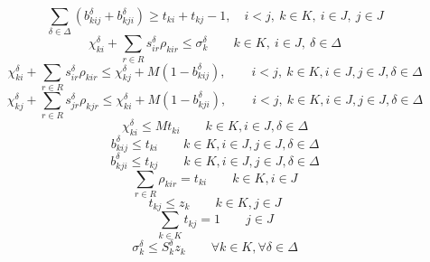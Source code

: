 \documentclass{scrartcl}
\begin{document}
\begin{equation}
\sum_{\delta\in\Delta}(b_{kij}^\delta + b_{kji}^\delta) \geq t_{ki} + t_{kj} - 1, \quad i < j,\ k \in K,\ i \in J,\ j \in J
\end{equation}
\begin{equation}
\label{eq:rho:kir:leq:sigmakdelta}
\chi_{ki}^\delta + \sum_{r \in R} s_{ir}^\delta \rho_{kir} \leq \sigma_k^\delta \quad \quad k \in K,\ i \in J,\ \delta \in \Delta
\end{equation}
\begin{equation}
\label{eq:rho:kir:leq:precedenceA}
\chi_{ki}^\delta + \sum_{r \in R} s_{ir}^\delta \rho_{kir} \leq \chi_{kj}^\delta + M(1 - b_{kij}^\delta), \quad \quad i < j,\ k \in K, i \in J, j \in J, \delta \in \Delta
\end{equation}
\begin{equation}
\label{eq:rho:kir:leq:precedenceB}
\chi_{kj}^\delta + \sum_{r \in R} s_{jr}^\delta \rho_{kjr} \leq \chi_{ki}^\delta + M(1 - b_{kji}^\delta), \quad \quad i < j,\ k \in K, i \in J, j \in J, \delta \in \Delta
\end{equation}
\begin{equation}
\chi_{ki}^\delta \leq M t_{ki}\quad\quad k \in K, i \in J, \delta \in \Delta
\end{equation}
\begin{equation}
b_{kij}^\delta \leq t_{ki}\quad \quad k \in K, i \in J, j \in J, \delta \in \Delta
\end{equation}
\begin{equation}
b_{kji}^\delta \leq t_{kj} \quad \quad k \in K, i \in J, j \in J, \delta \in \Delta
\end{equation}
\begin{equation}
\label{eq:rho:kir:sumofallrotation:tki}
\sum_{r \in R} \rho_{kir} = t_{ki}\quad \quad k \in K, i \in J
\end{equation}
\begin{equation}
\label{2:constraint:multi:tkzk}
t_{kj} \leq z_k\quad \quad k \in K, j \in J
\end{equation}
\begin{equation}
\label{2:constraint:multi:onlyInOneKnapsack}
\sum_{k \in K} t_{kj} = 1 \quad \quad j \in J
\end{equation}
\begin{equation}
\label{sigma_kdelta:leq:Skdelta}
\sigma_k^\delta \leq S_k^\delta z_k \quad \quad \forall k \in K, \forall \delta \in \Delta
\end{equation}
\end{document}
